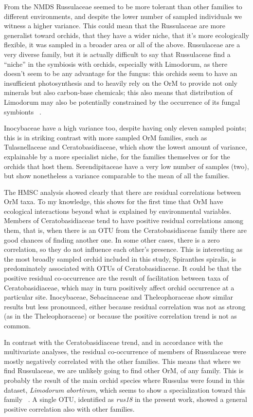 From the NMDS Russulaceae seemed to be more tolerant than other families to different environments, and despite the lower number of sampled individuals we witness a higher variance. This could mean that the Russulaceae are more generalist toward orchids, that they have a wider niche, that it's more ecologically flexible, it was sampled in a broader area or all of the above. Russulaceae are a very diverse family, but it is actually difficult to say that Russulaceae find a ``niche'' in the symbiosis with orchids, especially with Limodorum, as there doesn't seem to be any advantage for the fungus: this orchids seem to have an insufficient photosynthesis and to heavily rely on the OrM to provide not only minerals but also carbon-base chemicals; this also means that distribution of Limodorum may also be potentially constrained by the occurrence of its fungal symbionts ~\citep{girlanda2005}.

Inocybaceae have a high variance too, despite having only eleven sampled points; this is in striking contrast with more sampled OrM families, such as Tulasnellaceae and Ceratobasidiaceae, which show the lowest amount of variance, explainable by a more specialist niche, for the families themselves or for the orchids that host them. Serendipitaceae have a very low number of samples (two), but show nonetheless a variance comparable to the mean of all the families.

The HMSC analysis showed clearly that there are residual correlations between OrM taxa. To my knowledge, this shows for the first time that OrM have ecological interactions beyond what is explained by environmental variables. Members of Ceratobasidiaceae tend to have positive residual correlations among them, that is, when there is an OTU from the Ceratobasidiaceae family there are good chances of finding another one. In some other cases, there is a zero correlation, so they do not influence each other's presence. This is interesting as the most broadly sampled orchid included in this study, Spiranthes spiralis, is predominately associated with OTUs of Ceratobasidiaceae. It could be that the positive residual co-occurrence are the result of facilitation between taxa of Ceratobasidiaceae, which may in turn positively affect orchid occurrence at a particular site.
Inocybaceae, Sebacinaceae and Theleophoraceae show similar results but less pronounced, either because residual correlation was not as strong (as in the Theleophoraceae) or because the positive correlation trend is not as common.

In contrast with the Ceratobasidiaceae trend, and in accordance with the multivariate analyses, the residual co-occurrence of members of Russulaceae were mostly negatively correlated with the other families. This means that where we find Russulaceae, we are unlikely going to find other OrM, of any family. This is probably the result of the main orchid species where Russulas were found in this dataset, \emph{Limodorum abortivum}, which seems to show a specialization toward this family ~\citep{girlanda2005}. A single OTU, identified as \emph{rus18} in the present work, showed a general positive correlation also with other families.


